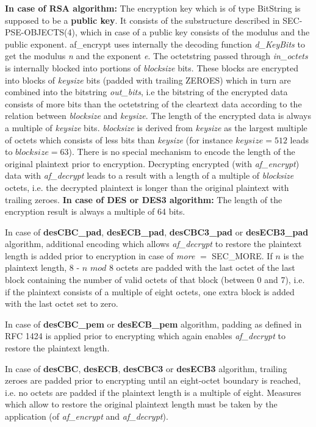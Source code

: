 {\bf In case of RSA algorithm:}
\be
\m The encryption key which is of type BitString is supposed to be
   a {\bf public key}. It consists of the substructure described in
   SEC-PSE-OBJECTS(4),
   which in case of a public key consists of the
   modulus and the public exponent. af\_encrypt uses internally the
   decoding function {\em d\_KeyBits} to get the modulus {\em n} and the exponent {\em e}.
\m The octetstring passed through {\em in\_octets} is internally blocked into portions of
   {\em blocksize} bits. These blocks are encrypted into blocks of {\em keysize} bits
   (padded with trailing ZEROES) which in turn are combined into the bitstring {\em out\_bits}, i.e
   the bitstring of the encrypted data consists of more bits than the octetstring of the cleartext data
   according to the relation between {\em blocksize} and {\em keysize}.
   The length of the encrypted data is always a multiple of {\em keysize} bits.
   {\em blocksize} is derived from {\em keysize} as the largest multiple of octets which consists of
   less bits than {\em keysize} (for instance $keysize = 512$ leads to $blocksize = 63$).
\m There is no special mechanism to encode the length of the original plaintext prior
   to encryption. Decrypting encrypted (with {\em af\_encrypt}) data with {\em af\_decrypt}
   leads to a result with a length of a multiple of {\em blocksize} octets, i.e. the decrypted
   plaintext is longer than the original plaintext with trailing zeroes.
\ee
{\bf In case of DES or DES3 algorithm:}
   The length of the encryption result is always a multiple of 64 bits.

   In case of {\bf desCBC\_pad}, {\bf desECB\_pad}, {\bf desCBC3\_pad} or 
   {\bf desECB3\_pad} algorithm, additional encoding which allows 
   {\em af\_decrypt} to restore the plaintext length is added prior
   to encryption in case of {\em more} $=$ SEC\_MORE. If $n$ is the plaintext length,
   8 - $n$ $mod$ 8 octets are padded with
   the last octet of the last block containing the number of 
   valid octets of that block (between 0 and 7), i.e. if the plaintext consists 
   of a multiple of eight octets, one extra block is added with the last octet set to zero.

   In case of {\bf desCBC\_pem} or {\bf desECB\_pem} algorithm, 
   padding as defined in RFC 1424 is applied prior to encrypting
   which again enables {\em af\_decrypt} to restore the plaintext length.

   In case of {\bf desCBC}, {\bf desECB}, {\bf desCBC3} or {\bf desECB3} algorithm,
   trailing zeroes are padded prior to encrypting until an eight-octet boundary is reached, i.e.
   no octets are padded if the plaintext length is a multiple of eight.
   Measures which allow to restore the original plaintext length must
   be taken by the application (of {\em af\_encrypt} and {\em af\_decrypt}).

